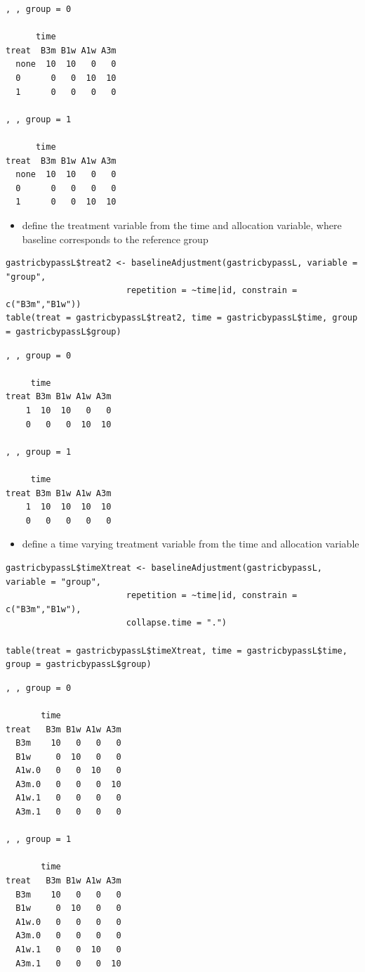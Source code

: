 \documentclass[12pt]{article}
\begin{document}
\begin{verbatim}
, , group = 0

      time
treat  B3m B1w A1w A3m
  none  10  10   0   0
  0      0   0  10  10
  1      0   0   0   0

, , group = 1

      time
treat  B3m B1w A1w A3m
  none  10  10   0   0
  0      0   0   0   0
  1      0   0  10  10
\end{verbatim}

\begin{itemize}
\item define the treatment variable from the time and allocation variable,
where baseline corresponds to the reference group
\end{itemize}
\lstset{language=r,label= ,caption= ,captionpos=b,numbers=none}
\begin{lstlisting}
gastricbypassL$treat2 <- baselineAdjustment(gastricbypassL, variable = "group",
					    repetition = ~time|id, constrain = c("B3m","B1w"))
table(treat = gastricbypassL$treat2, time = gastricbypassL$time, group = gastricbypassL$group)
\end{lstlisting}

\begin{verbatim}
, , group = 0

     time
treat B3m B1w A1w A3m
    1  10  10   0   0
    0   0   0  10  10

, , group = 1

     time
treat B3m B1w A1w A3m
    1  10  10  10  10
    0   0   0   0   0
\end{verbatim}

\begin{itemize}
\item define a time varying treatment variable from the time and allocation variable
\end{itemize}
\lstset{language=r,label= ,caption= ,captionpos=b,numbers=none}
\begin{lstlisting}
gastricbypassL$timeXtreat <- baselineAdjustment(gastricbypassL, variable = "group",
						repetition = ~time|id, constrain = c("B3m","B1w"),
						collapse.time = ".")

table(treat = gastricbypassL$timeXtreat, time = gastricbypassL$time, group = gastricbypassL$group)
\end{lstlisting}

\begin{verbatim}
, , group = 0

       time
treat   B3m B1w A1w A3m
  B3m    10   0   0   0
  B1w     0  10   0   0
  A1w.0   0   0  10   0
  A3m.0   0   0   0  10
  A1w.1   0   0   0   0
  A3m.1   0   0   0   0

, , group = 1

       time
treat   B3m B1w A1w A3m
  B3m    10   0   0   0
  B1w     0  10   0   0
  A1w.0   0   0   0   0
  A3m.0   0   0   0   0
  A1w.1   0   0  10   0
  A3m.1   0   0   0  10
\end{verbatim}
\end{document}

